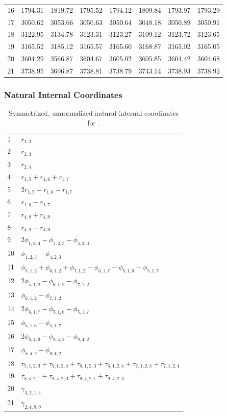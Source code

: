 \documentclass[10pt,oneside]{article}
\begin{document}
\begin{table}[h!]
\begin{tabular}{cccccccc}
16 &   1794.31 & 1819.72 & 1795.52 & 1794.12 &      1809.84 & 1793.97 & 1793.29 \\
17 &   3050.62 & 3053.66 & 3050.63 & 3050.64 &      3048.18 & 3050.89 & 3050.91 \\
18 &   3122.95 & 3134.78 & 3123.31 & 3123.27 &      3109.12 & 3123.72 & 3123.65 \\
19 &   3165.52 & 3185.12 & 3165.57 & 3165.60 &      3168.87 & 3165.02 & 3165.05 \\
20 &   3604.29 & 3566.87 & 3604.67 & 3605.02 &      3605.85 & 3604.42 & 3604.68 \\
21 &   3738.95 & 3696.87 & 3738.81 & 3738.79 &      3743.14 & 3738.93 & 3738.92 \\
\bottomrule
\end{tabular}
\end{table}

\clearpage

\subsubsection*{Natural Internal Coordinates}
\begin{table}[h!]
\centering
\caption{Symmetrized, unnormalized natural internal coordinates for .}
\small
\begin{tabular}{ll}
  1   & $r_{1,2}$ \\
  2   & $r_{2,3}$ \\
  3   & $r_{2,4}$ \\
  4   & $r_{1,5} + r_{1,6} + r_{1,7}$ \\
  5   & $2r_{1,5} - r_{1,6} - r_{1,7}$ \\
  6   & $r_{1,6} - r_{1,7}$ \\
  7   & $r_{4,8} + r_{4,9}$ \\
  8   & $r_{4,8} - r_{4,9}$ \\
  9   & $2\phi_{1,2,4} - \phi_{1,2,3} - \phi_{4,2,3}$ \\
  10  & $\phi_{1,2,3} - \phi_{4,2,3}$ \\
  11  & $\phi_{5,1,2} + \phi_{6,1,2} + \phi_{7,1,2} - \phi_{6,1,7} - \phi_{5,1,6} - \phi_{5,1,7}$ \\
  12  & $2\phi_{5,1,2} - \phi_{6,1,2} - \phi_{7,1,2}$ \\
  13  & $\phi_{6,1,2} - \phi_{7,1,2}$ \\
  14  & $2\phi_{6,1,7} - \phi_{5,1,6} - \phi_{5,1,7}$ \\
  15  & $\phi_{5,1,6} - \phi_{5,1,7}$ \\
  16  & $2\phi_{8,4,9} - \phi_{8,4,2} - \phi_{9,4,2}$ \\
  17  & $\phi_{8,4,2} - \phi_{9,4,2}$ \\
  18  & $\tau_{5,1,2,3} + \tau_{5,1,2,4} + \tau_{6,1,2,3} + \tau_{6,1,2,4} + \tau_{7,1,2,3} + \tau_{7,1,2,4}$ \\
  19  & $\tau_{8,4,2,1} + \tau_{8,4,2,3} + \tau_{9,4,2,1} + \tau_{9,4,2,3}$ \\
  20  & $\gamma_{3,2,1,4}$ \\
  21  & $\gamma_{2,4,8,9}$ \\
\end{tabular}
\end{table}
\end{document}
